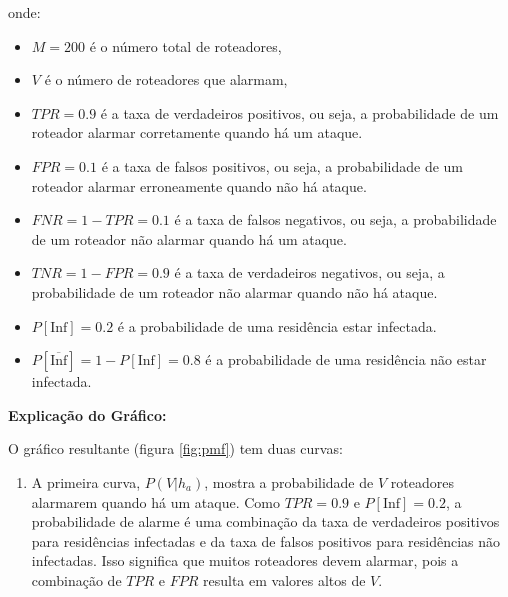 \documentclass[12 pt]{article}
\begin{document}
\begin{enumerate}
\begin{tcolorbox}[colback=white, colframe=black, title=Resposta:]
\begin{enumerate}
           onde:
            \begin{itemize}
                \item \( M = 200 \) é o número total de roteadores,
                \item \( V \) é o número de roteadores que alarmam,
                \item \( TPR = 0.9 \) é a taxa de verdadeiros positivos, ou seja, a probabilidade de um roteador alarmar corretamente quando há um ataque.
                \item \( FPR = 0.1 \) é a taxa de falsos positivos, ou seja, a probabilidade de um roteador alarmar erroneamente quando não há ataque.
                \item \( FNR = 1 - TPR = 0.1 \) é a taxa de falsos negativos, ou seja, a probabilidade de um roteador não alarmar quando há um ataque.
                \item \( TNR = 1 - FPR = 0.9 \) é a taxa de verdadeiros negativos, ou seja, a probabilidade de um roteador não alarmar quando não há ataque.
                \item $P[\text{Inf}] = 0.2$ é a probabilidade de uma residência estar infectada.
                \item $P[\overline{\text{Inf}}] = 1 - P[\text{Inf}] = 0.8$ é a probabilidade de uma residência não estar infectada.
            \end{itemize}

        \end{enumerate}
        
        \end{tcolorbox}

        \begin{tcolorbox}[colback=white, colframe=black, title=Resposta (continuação):]
        
        \textbf{Explicação do Gráfico:}
        
        O gráfico resultante (figura \ref{fig:pmf}) tem duas curvas:
        \begin{enumerate}
            \item A primeira curva, \( P(V | h_a) \), mostra a probabilidade de \( V \) roteadores alarmarem quando há um ataque. Como \( TPR = 0.9 \) e \( P[\text{Inf}] = 0.2 \), a probabilidade de alarme é uma combinação da taxa de verdadeiros positivos para residências infectadas e da taxa de falsos positivos para residências não infectadas. Isso significa que muitos roteadores devem alarmar, pois a combinação de \( TPR \) e \( FPR \) resulta em valores altos de \( V \).
            

\end{enumerate}
\end{tcolorbox}
\end{enumerate}
\end{document}
